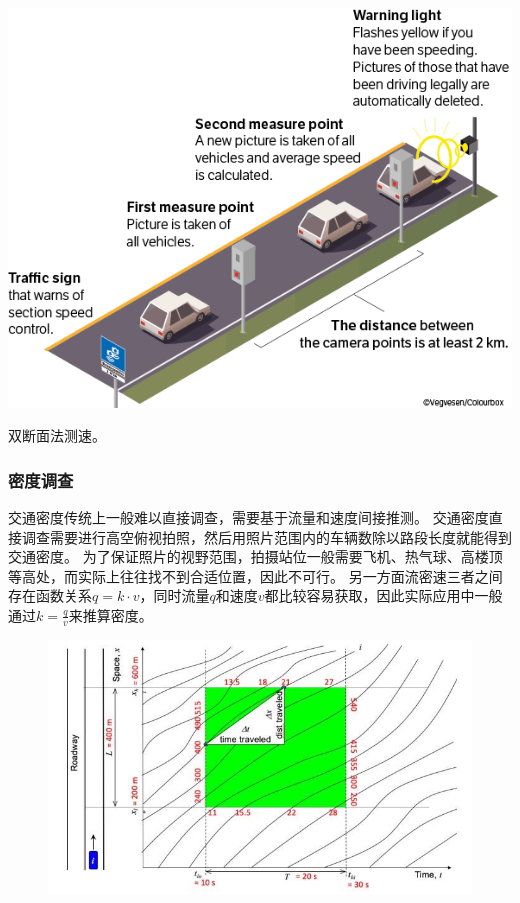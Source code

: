 \begin{marginfigure}
    \includegraphics[width=\linewidth]{images/section-speed.png}
    \caption{双断面法测速。}
    \label{fig:section-speed}
\end{marginfigure}

\subsubsection{密度调查}
交通密度传统上一般难以直接调查，需要基于流量和速度间接推测。
交通密度直接调查需要进行高空俯视拍照，然后用照片范围内的车辆数除以路段长度就能得到交通密度。
为了保证照片的视野范围，拍摄站位一般需要飞机、热气球、高楼顶等高处，而实际上往往找不到合适位置，因此不可行。
另一方面流密速三者之间存在函数关系$q=k\cdot v$，同时流量$q$和速度$v$都比较容易获取，因此实际应用中一般通过$k=\frac{q}{v}$来推算密度。

\begin{figure}
    \includegraphics[width=\linewidth]{images/flow-density-speed.jpeg}
    \label{fig:trajectory}
\end{figure}
